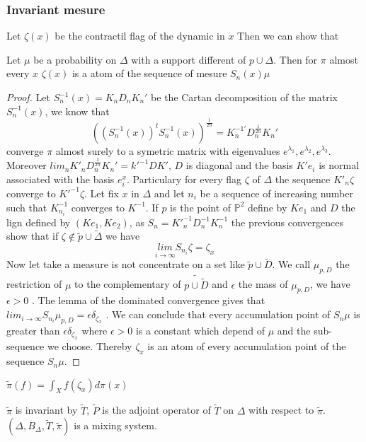 \subsubsection{Invariant mesure}
Let $\zeta(x)$ be the contractil flag of the dynamic in $x$\newline
Then we can show that
\begin{thm}
\tabto{2cm} Let $\mu$ be a probability on $\Delta$ with a support different of $p \cup \Delta$. Then for $\pi$ almost every $x$ $\zeta(x)$ is a atom of the sequence of mesure $S_n(x)\mu$
\end{thm}
\begin{proof}
Let $S_n^{-1}(x)=K_n D_n K_n'$ be the Cartan decomposition of the matrix $S_n^{-1}(x)$, we know that \[
((S_n^{-1}(x))^{t}
 S_n^{-1}(x))^{\frac{1}{2n}} =
 K_n^{-1'}
 D_n^{\frac{1}{2n}}
 K_n'
\]
\tabto{2cm} converge $\pi$ almost surely to a symetric matrix with eigenvalues $e^{\lambda_1},e^{\lambda_2},e^{\lambda_3}$. Moreover $lim_n K'_n D_n^{\frac{1}{2n}} K_n'=k'^{-1}D K'$, $D$ is diagonal and the basis $K' e_i$ is normal associated with the basis $e_i^{x}$. \newline
Particulary for every flag $\zeta$ of $\Delta$ the sequence $K'_n \zeta$ converge to $K'^{-1} \zeta$.
 \tabto{2cm} Let fix $x$ in $\Delta$ and let $n_i$ be a sequence of increasing number such that $K^{-1}_{n_i}$ converges to $K^{-1}$.
If $p$ is the point of $\mathbb{P}^2$ define by $K e_1$
 and $D$ the lign defined by $(K e_1, K e_2)$, as $S_n= K'^{-1}_n D_n^{-1} K_n^{-1}$ the previous convergences show that if $\zeta \notin \tilde{p} \cup \tilde{\Delta}$ we have \[
\underset{i \to \infty}{lim} S_{n_i} \zeta =\zeta_x
\]
\tabto{2cm} Now let take a measure is not concentrate on a set like $\tilde{p} \cup \tilde{D}$. We call $\mu_{p,D}$ the restriction of $\mu$ to the complementary of $\tilde{p \cup \tilde{D}}$ and $\epsilon$ the mass of $\mu_{p,D}$, we have $\epsilon > 0$ . The lemma of the dominated convergence gives that $lim_{i \to \infty} S_{n_i} \mu_{p,D} = \epsilon \delta_{\zeta_x}$ .
We can conclude that every accumulation point of $S_n \mu$ is greater than $\epsilon \delta_{\zeta_x}$ where $\epsilon > 0$
is a constant which depend of $\mu$ and the sub-sequence we choose. Thereby $\zeta_x$ is an atom of every accumulation point of the sequence $S_n \mu$.
\end{proof}
\begin{dfnt}
$\tilde{\pi}(f)=\int_X f(\zeta_x) d \pi(x)$
\end{dfnt}

\begin{thm}
$\tilde{\pi}$ is invariant by $\tilde{T}$, $\tilde{P}$ is the adjoint operator of $\tilde{T}$ on $\Delta$ with respect to $\tilde{\pi}$. $(\Delta,B_\Delta,\tilde{T},\tilde{\pi})$ is a mixing system.
\end{thm}

